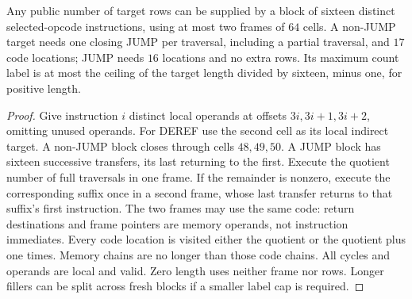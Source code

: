 \begin{lemma}\label{lem:zk-batched-local-filler}
Any public number of target rows can be supplied by a block of sixteen distinct selected-opcode instructions, using at most two frames of $64$ cells. A non-JUMP target needs one closing JUMP per traversal, including a partial traversal, and $17$ code locations; JUMP needs $16$ locations and no extra rows. Its maximum count label is at most the ceiling of the target length divided by sixteen, minus one, for positive length.
\end{lemma}
\begin{proof}
Give instruction $i$ distinct local operands at offsets $3i,3i+1,3i+2$, omitting unused operands. For DEREF use the second cell as its local indirect target. A non-JUMP block closes through cells $48,49,50$. A JUMP block has sixteen successive transfers, its last returning to the first. Execute the quotient number of full traversals in one frame. If the remainder is nonzero, execute the corresponding suffix once in a second frame, whose last transfer returns to that suffix's first instruction. The two frames may use the same code: return destinations and frame pointers are memory operands, not instruction immediates. Every code location is visited either the quotient or the quotient plus one times. Memory chains are no longer than those code chains. All cycles and operands are local and valid. Zero length uses neither frame nor rows. Longer fillers can be split across fresh blocks if a smaller label cap is required.
\end{proof}

